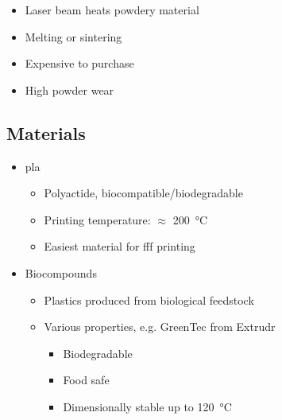 \documentclass[aspectratio=169]{beamer}
\begin{document}
\begin{frame}
    \begin{itemize}
        \item Laser beam heats powdery material
        \item Melting or sintering
        \item Expensive to purchase
        \item High powder wear
    \end{itemize}
\end{frame}

\subsection{Materials}
\begin{frame}
    \begin{itemize}
        \item \acs{pla}
              \begin{itemize}
                  \item Polyactide, biocompatible/biodegradable
                  \item Printing temperature: $\approx$ \SI{200}{\celsius}
                  \item Easiest material for \acs{fff} printing
              \end{itemize}
        \item Biocompounds
              \begin{itemize}
                  \item Plastics produced from biological feedstock
                  \item Various properties, e.g. GreenTec from Extrudr
                        \begin{itemize}
                            \item Biodegradable
                            \item Food safe
                            \item Dimensionally stable up to \SI{120}{\celsius}
                        \end{itemize}
              \end{itemize}
    \end{itemize}
\end{frame}
\end{document}

